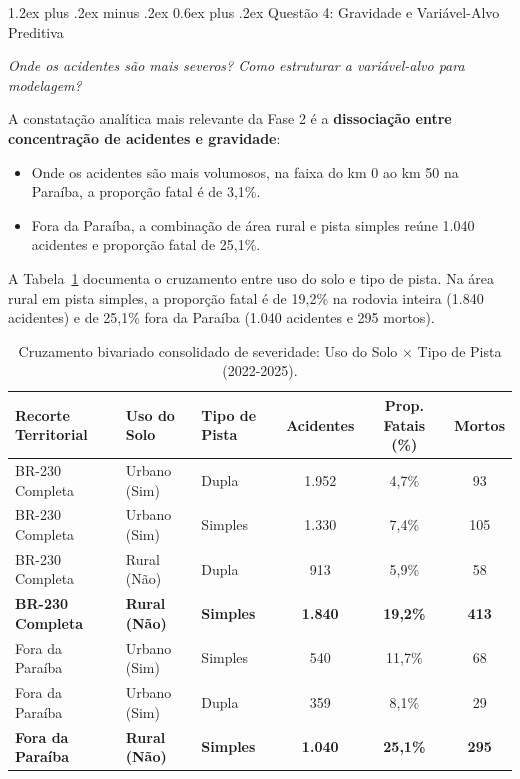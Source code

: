 \documentclass[11pt,a4paper]{article}
\makeatletter
\renewcommand\subsection{
\@startsection{subsection}{2}{0pt}%
{1.2ex plus .2ex minus .2ex}%
{0.6ex plus .2ex}%
{\normalfont\large\bfseries\color{secondary}}
}
\makeatother
\begin{document}
\subsection{Questão 4: Gravidade e Variável-Alvo Preditiva}

\textit{Onde os acidentes são mais severos? Como estruturar a variável-alvo para modelagem?}

A constatação analítica mais relevante da Fase 2 é a \textbf{dissociação entre concentração de acidentes e gravidade}:
\begin{itemize}
    \item Onde os acidentes são mais volumosos, na faixa do km 0 ao km 50 na Paraíba, a proporção fatal é de 3,1\%.
    \item Fora da Paraíba, a combinação de área rural e pista simples reúne 1.040 acidentes e proporção fatal de 25,1\%.
\end{itemize}

A Tabela~\ref{tab:cruzada} documenta o cruzamento entre uso do solo e tipo de pista. Na área rural em pista simples, a proporção fatal é de 19,2\% na rodovia inteira (1.840 acidentes) e de 25,1\% fora da Paraíba (1.040 acidentes e 295 mortos).

\begin{table}[H]
\centering
\small
\renewcommand{\arraystretch}{1.2}
\caption{Cruzamento bivariado consolidado de severidade: Uso do Solo $\times$ Tipo de Pista (2022-2025).}
\label{tab:cruzada}
\begin{tabularx}{\textwidth}{|p{3.8cm}|p{2.5cm}|p{2.5cm}|c|c|c|}
\hline
\textbf{Recorte Territorial} & \textbf{Uso do Solo} & \textbf{Tipo de Pista} & \textbf{Acidentes} & \textbf{Prop. Fatais (\%)} & \textbf{Mortos} \\
\hline
BR-230 Completa & Urbano (Sim) & Dupla & 1.952 & 4,7\% & 93 \\
\hline
BR-230 Completa & Urbano (Sim) & Simples & 1.330 & 7,4\% & 105 \\
\hline
BR-230 Completa & Rural (Não) & Dupla & 913 & 5,9\% & 58 \\
\hline
\textbf{BR-230 Completa} & \textbf{Rural (Não)} & \textbf{Simples} & \textbf{1.840} & \textbf{19,2\%} & \textbf{413} \\
\hline
\hline
Fora da Paraíba & Urbano (Sim) & Simples & 540 & 11,7\% & 68 \\
\hline
Fora da Paraíba & Urbano (Sim) & Dupla & 359 & 8,1\% & 29 \\
\hline
\textbf{Fora da Paraíba} & \textbf{Rural (Não)} & \textbf{Simples} & \textbf{1.040} & \textbf{25,1\%} & \textbf{295} \\
\hline
\end{tabularx}
\end{table}
\end{document}

